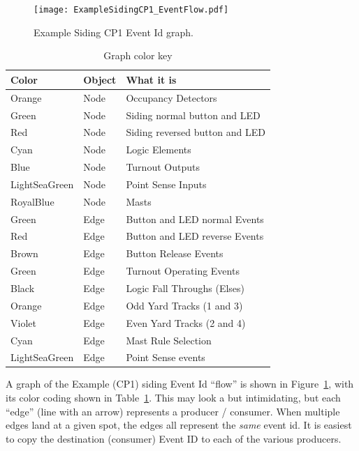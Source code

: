 \begin{figure}[hbpt]\begin{centering}%
\texttt{[image: ExampleSidingCP1\_EventFlow.pdf]}
\caption{Example Siding CP1  Event Id graph.}
\label{fig:ExampleSidingCP1EventFlow}
\end{centering}\end{figure}
\begin{table}[hbpt]\begin{centering}%
\begin{tabular}{|l|l|p{2in}|}
\hline
Color&Object&What it is\\
\hline
Orange&Node&Occupancy Detectors\\
\hline
Green&Node&Siding normal button and LED\\
\hline
Red&Node&Siding reversed button and LED\\
\hline
Cyan&Node&Logic Elements\\
\hline
Blue&Node&Turnout Outputs\\
\hline
LightSeaGreen&Node&Point Sense Inputs\\
\hline
RoyalBlue&Node&Masts\\
\hline 
Green&Edge&Button and LED normal Events\\
\hline
Red&Edge&Button and LED reverse Events\\
\hline
Brown&Edge&Button Release Events\\
\hline
Green&Edge&Turnout Operating Events\\
\hline
Black&Edge&Logic Fall Throughs (Elses)\\
\hline
Orange&Edge&Odd Yard Tracks (1 and 3)\\
\hline
Violet&Edge&Even Yard Tracks (2 and 4)\\
\hline
Cyan&Edge&Mast Rule Selection\\
\hline
LightSeaGreen&Edge&Point Sense events\\
\hline
\end{tabular}
\caption{Graph color key}
\label{tab:ExampleSidingCP1EventFlow}
\end{centering}\end{table}

A graph of the Example (CP1) siding Event Id ``flow'' is shown in 
Figure~\ref{fig:ExampleSidingCP1EventFlow}, with its color coding shown in 
Table~\ref{tab:ExampleSidingCP1EventFlow}. This may look a but intimidating, 
but each ``edge'' (line with an arrow) represents a producer / consumer. When 
multiple edges land at a given spot, the edges all represent the \textit{same} 
event id. It is easiest to copy the destination (consumer) Event ID to each of 
the various producers.


\clearpage
